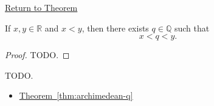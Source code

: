 \newpage
{}
\label{prf:q-dense-in-r}

\begin{remark*}[Return]
\hyperref[thm:q-dense-in-r]{Return to Theorem}
\end{remark*}

\begin{theorem*}
If $x,y\in\mathbb{R}$ and $x<y$, then there exists $q\in\mathbb{Q}$ such that
\[
x<q<y.
\]
\end{theorem*}

\begin{proof}
TODO.
\end{proof}

\begin{remark*}
TODO.
\end{remark*}

\begin{dependencies}
\begin{itemize}
  \item \hyperref[thm:archimedean-q]{Theorem~\ref*{thm:archimedean-q}}
\end{itemize}
\end{dependencies}


